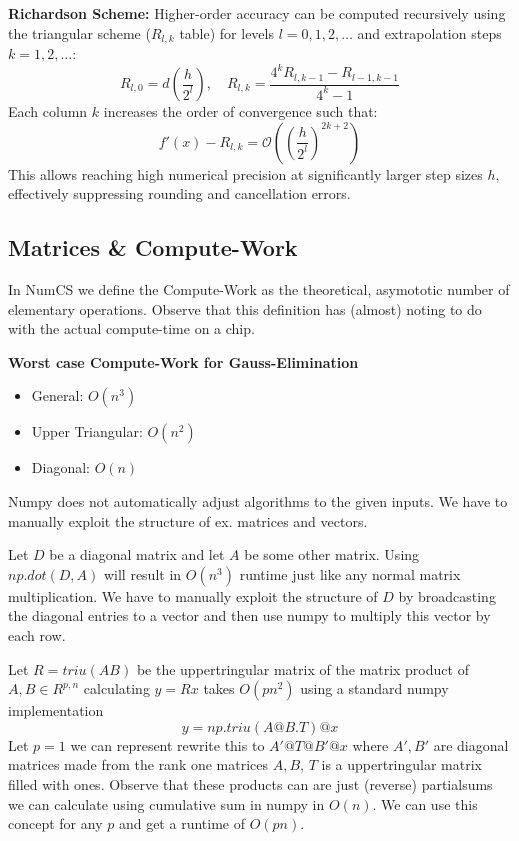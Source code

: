 \begin{definition}
    \textbf{Richardson Scheme:} Higher-order accuracy can be computed recursively using the triangular scheme ($R_{l,k}$ table) for levels $l = 0, 1, 2, \dots$ and extrapolation steps $k = 1, 2, \dots$:$$R_{l,0} = d\left(\frac{h}{2^l}\right), \quad R_{l,k} = \frac{4^k R_{l,k-1} - R_{l-1,k-1}}{4^k - 1}$$Each column $k$ increases the order of convergence such that:$$f'(x) - R_{l,k} = \mathcal{O}\left(\left(\frac{h}{2^l}\right)^{2k+2}\right)$$This allows reaching high numerical precision at significantly larger step sizes $h$, effectively suppressing rounding and cancellation errors.
\end{definition}

\subsection{Matrices \& Compute-Work}

\begin{important}
    In NumCS we define the Compute-Work as the theoretical, asymototic number of elementary operations.
    Observe that this definition has (almost) noting to do with the actual compute-time on a chip.
\end{important}

\begin{example}
    \textbf{Worst case Compute-Work for Gauss-Elimination}
    \begin{itemize}
        \item General: $O(n^3)$
        \item Upper Triangular: $O(n^2)$
        \item Diagonal: $O(n)$
    \end{itemize}
\end{example}

\begin{important}
    Numpy does not automatically adjust algorithms to the given inputs. We have to manually exploit the structure of ex. matrices and vectors.
\end{important}

\begin{example}
    Let $D$ be a diagonal matrix and let $A$ be some other matrix. Using $np.dot(D,A)$ will result in $O(n^3)$ runtime just like any normal matrix multiplication. We have to manually exploit the structure of $D$ by broadcasting the diagonal entries to a vector and then use numpy to multiply this vector by each row.
\end{example}

\begin{example}
    Let $R = triu(AB)$ be the uppertringular matrix of the matrix product of $A, B  \in R^{p,n}$ calculating $y = Rx$ takes $O(pn^2)$ using a standard numpy implementation
    $$y = np.triu(A @ B.T) @ x$$
    Let $p=1$ we can represent rewrite this to $A' @ T @ B' @ x$ where $A', B'$ are diagonal matrices made from the rank one matrices $A, B$, $T$ is a uppertringular matrix filled with ones. Observe that these products can are just (reverse) partialsums we can calculate using cumulative sum in numpy in $O(n)$.
    We can use this concept for any $p$ and get a runtime of $O(pn)$.
\end{example}